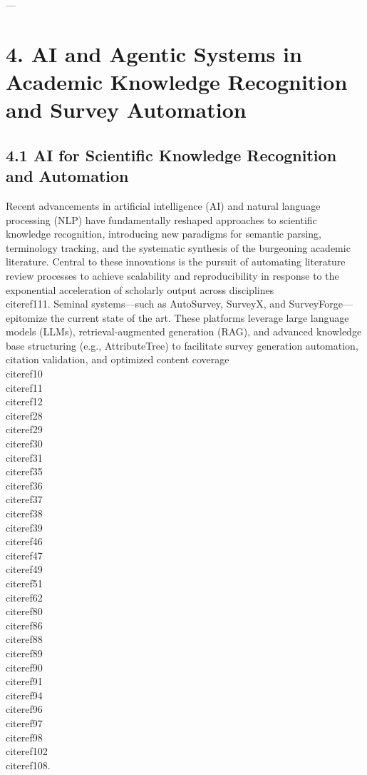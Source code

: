 \documentclass[11pt]{article}
\begin{document}
---
\section{4. AI and Agentic Systems in Academic Knowledge Recognition and Survey Automation}

\subsection{4.1 AI for Scientific Knowledge Recognition and Automation}

Recent advancements in artificial intelligence (AI) and natural language processing (NLP) have fundamentally reshaped approaches to scientific knowledge recognition, introducing new paradigms for semantic parsing, terminology tracking, and the systematic synthesis of the burgeoning academic literature. Central to these innovations is the pursuit of automating literature review processes to achieve scalability and reproducibility in response to the exponential acceleration of scholarly output across disciplines \\cite{ref111}. Seminal systems—such as AutoSurvey, SurveyX, and SurveyForge—epitomize the current state of the art. These platforms leverage large language models (LLMs), retrieval-augmented generation (RAG), and advanced knowledge base structuring (e.g., AttributeTree) to facilitate survey generation automation, citation validation, and optimized content coverage \\cite{ref10}\\cite{ref11}\\cite{ref12}\\cite{ref28}\\cite{ref29}\\cite{ref30}\\cite{ref31}\\cite{ref35}\\cite{ref36}\\cite{ref37}\\cite{ref38}\\cite{ref39}\\cite{ref46}\\cite{ref47}\\cite{ref49}\\cite{ref51}\\cite{ref62}\\cite{ref80}\\cite{ref86}\\cite{ref88}\\cite{ref89}\\cite{ref90}\\cite{ref91}\\cite{ref94}\\cite{ref96}\\cite{ref97}\\cite{ref98}\\cite{ref102}\\cite{ref108}.
\end{document}
